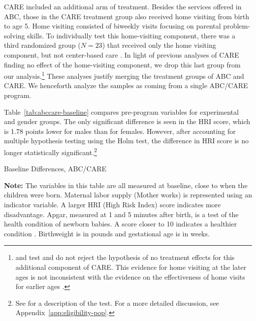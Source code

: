 CARE included an additional arm of treatment. Besides the services offered in ABC, those in the CARE treatment group also received home visiting from birth to age 5. Home visiting consisted of biweekly visits focusing on parental problem-solving skills. To individually test this home-visiting component, there was a third randomized group ($N=23$) that received only the home visiting component, but not center-based care \citep{Wasik_Ramey_etal_1990_CD}. In light of previous analyses of CARE finding no effect of the home-visiting component, we drop this last group from our analysis.\footnote{\citet{Campbell_Conti_etal_2014_EarlyChildhoodInvestments} and \citet{Burchinal_etal_2006_MSRCD_IV-Growth-Curve} test and do not reject the hypothesis of no treatment effects for this additional component of CARE. This evidence for home visiting at the later ages is not inconsistent with the evidence on the effectiveness of home visits for earlier ages \citep{Doyle_2017_School,Gertler_Heckman_etal_2014_Science}.} These analyses justify merging the treatment groups of ABC and CARE. We henceforth analyze the samples as coming from a single ABC/CARE program.

Table~\ref{tab:abccare-baseline} compares pre-program variables for experimental and gender groups. The only significant difference is seen in the HRI score, which is 1.78 points lower for males than for females. However, after accounting for multiple hypothesis testing using the Holm test, the difference in HRI score is no longer statistically significant.\footnote{See \citet{Holme_1979_Sequential_SJS} for a description of the test. For a more detailed discussion, see Appendix~\ref{app:eligibility-pop}.}

\begin{table}[!htbp]
\centering
\caption{Baseline Differences, ABC/CARE}
\label{tab:abccare-baseline}
\begin{threeparttable}
	
\begin{tablenotes}
\footnotesize
\item \textbf{Note:} The variables in this table are all measured at baseline, close to when the children were born. Maternal labor supply (Mother works) is represented using an indicator variable. A larger HRI (High Risk Index) score indicates more disadvantage. Apgar, measured at 1 and 5 minutes after birth, is a test of the health condition of newborn babies. A score closer to 10 indicates a healthier condition \citep{Apgar_1966_APGAR-Scoring_PCNA}. Birthweight is in pounds and gestational age is in weeks.
\end{tablenotes}
\end{threeparttable}
\end{table}

